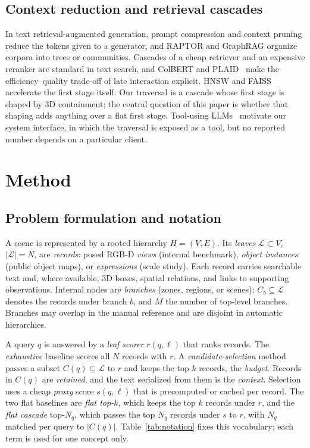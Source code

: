 \documentclass{ieeeaccess}
\begin{document}
\subsection{Context reduction and retrieval cascades}
In text retrieval-augmented generation, prompt compression and context pruning
\cite{promptcompression2024,longllmlingua2023,recomp2023,provence2025,
attentionrag2025} reduce the tokens given to a generator, and RAPTOR and GraphRAG
\cite{raptor2024,edge2024graphrag} organize corpora into trees or communities.
Cascades of a cheap retriever and an expensive reranker are standard in text
search, and ColBERT and PLAID~\cite{colbert2020,plaid2022} make the
efficiency--quality trade-off of late interaction explicit. HNSW and FAISS
\cite{hnsw2020,faiss2019} accelerate the first stage itself. Our traversal is a
cascade whose first stage is shaped by 3D containment; the central question of
this paper is whether that shaping adds anything over a flat first stage.
Tool-using LLMs~\cite{react2023,toolformer2023} motivate our system interface, in
which the traversal is exposed as a tool, but no reported number depends on a
particular client.

\section{Method}
\label{sec:method}

\subsection{Problem formulation and notation}
A scene is represented by a rooted hierarchy $H=(V,E)$. Its \emph{leaves}
$\mathcal{L}\subset V$, $|\mathcal{L}|=N$, are \emph{records}: posed RGB-D
\emph{views} (internal benchmark), \emph{object instances} (public object maps),
or \emph{expressions} (scale study). Each record carries searchable text and,
where available, 3D boxes, spatial relations, and links to supporting
observations. Internal nodes are \emph{branches} (zones, regions, or scenes);
$C_b\subseteq\mathcal{L}$ denotes the records under branch $b$, and $M$ the
number of top-level branches. Branches may overlap in the manual reference and
are disjoint in automatic hierarchies.

A query $q$ is answered by a \emph{leaf scorer} $r(q,\ell)$ that ranks records.
The \emph{exhaustive} baseline scores all $N$ records with $r$. A
\emph{candidate-selection} method passes a subset $C(q)\subseteq\mathcal{L}$ to
$r$ and keeps the top $k$ records, the \emph{budget}. Records in $C(q)$ are
\emph{retained}, and the text serialized from them is the \emph{context}.
Selection uses a cheap \emph{proxy} score $s(q,\ell)$ that is precomputed or
cached per record. The two flat baselines are \emph{flat top-$k$}, which keeps
the top $k$ records under $r$, and the \emph{flat cascade} top-$N_q$, which
passes the top $N_q$ records under $s$ to $r$, with $N_q$ matched per query to
$|C(q)|$. Table~\ref{tab:notation} fixes this vocabulary; each term is used for
one concept only.
\end{document}
